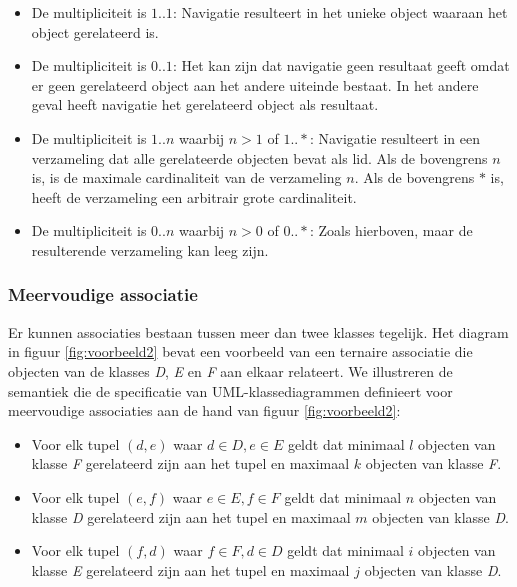 \begin{itemize}
	\item De multipliciteit is $1..1$: Navigatie resulteert in het unieke object waaraan het object gerelateerd is.
	\item De multipliciteit is $0..1$: Het kan zijn dat navigatie geen resultaat geeft omdat er geen gerelateerd object aan het andere uiteinde bestaat. In het andere geval heeft navigatie het gerelateerd object als resultaat.
	\item De multipliciteit is $1..n$ waarbij $n > 1$ of $1..*$: Navigatie resulteert in een verzameling dat alle gerelateerde objecten bevat als lid. Als de bovengrens $n$ is, is de maximale cardinaliteit van de verzameling $n$. Als de bovengrens $*$ is, heeft de verzameling een arbitrair grote cardinaliteit.
	\item De multipliciteit is $0..n$ waarbij $n > 0$ of $0..*$: Zoals hierboven, maar de resulterende verzameling kan leeg zijn.
\end{itemize}

\subsubsection{Meervoudige associatie}\label{sec:nary-assoc}

Er kunnen associaties bestaan tussen meer dan twee klasses tegelijk. Het diagram in figuur \ref{fig:voorbeeld2} bevat een voorbeeld van een ternaire associatie die objecten van de klasses \textit{D}, \textit{E} en \textit{F} aan elkaar relateert. We illustreren de semantiek die de specificatie van UML-klassediagrammen\cite{OMG-UML} definieert voor meervoudige associaties aan de hand van figuur \ref{fig:voorbeeld2}:

\begin{itemize}
	\item Voor elk tupel $(d,e)$ waar $d \in D, e \in E$ geldt dat minimaal $l$ objecten van klasse \textit{F} gerelateerd zijn aan het tupel en maximaal $k$ objecten van klasse \textit{F}.
	\item Voor elk tupel $(e,f)$ waar $e \in E, f \in F$ geldt dat minimaal $n$ objecten van klasse \textit{D} gerelateerd zijn aan het tupel en maximaal $m$ objecten van klasse \textit{D}.
	\item Voor elk tupel $(f,d)$ waar $f \in F, d \in D$ geldt dat minimaal $i$ objecten van klasse \textit{E} gerelateerd zijn aan het tupel en maximaal $j$ objecten van klasse \textit{D}.
\end{itemize}

